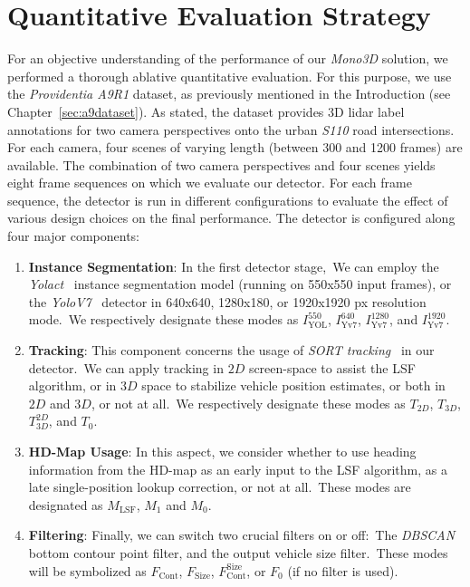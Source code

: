 
\section{Quantitative Evaluation Strategy}
\label{sec:quant}

For an objective understanding of the performance of our \textit{Mono3D} solution, we performed a thorough ablative quantitative evaluation.
For this purpose, we use the \textit{Providentia A9R1} dataset, as previously mentioned in the Introduction (see Chapter~\ref{sec:a9dataset}).
As stated, the dataset provides 3D lidar label annotations for two camera perspectives onto the urban \textit{S110} road intersections.
For each camera, four scenes of varying length (between 300 and 1200 frames) are available.
The combination of two camera perspectives and four scenes yields eight frame sequences on which we evaluate our detector.
For each frame sequence, the detector is run in different configurations to evaluate the effect of various design choices on the final performance.
The detector is configured along four major components:

\begin{enumerate}
    \item \textbf{Instance Segmentation}: In the first detector stage,\ We can employ the \textit{Yolact}~\cite{liu2021yolactedge} instance segmentation model (running on 550x550 input frames), or the \textit{YoloV7}~\cite{wang2022yolov7} detector in 640x640, 1280x180, or 1920x1920 px resolution mode.\ We respectively designate these modes as $I^{550}_\text{YOL}$, $I^{640}_\text{Yv7}$, $I^{1280}_\text{Yv7}$, and $I^{1920}_\text{Yv7}$.
    \item \textbf{Tracking}: This component concerns the usage of \textit{SORT tracking}~\cite{bewley2016simple} in our detector.\ We can apply tracking in $2D$ screen-space to assist the LSF algorithm, or in $3D$ space to stabilize vehicle position estimates, or both in $2D$ and $3D$, or not at all.\ We respectively designate these modes as $T_{2D}$, $T_{3D}$, $T^{2D}_{3D}$, and $T_0$.
    \item \textbf{HD-Map Usage}: In this aspect, we consider whether to use heading information from the HD-map as an early input to the LSF algorithm, as a late single-position lookup correction, or not at all.\ These modes are designated as $M_\text{LSF}$, $M_1$ and $M_0$.
    \item \textbf{Filtering}: Finally, we can switch two crucial filters on or off:\ The \textit{DBSCAN}~\cite{schubert2017dbscan} bottom contour point filter, and the output vehicle size filter.\ These modes will be symbolized as $F_\text{Cont}$, $F_\text{Size}$, $F_\text{Cont}^\text{Size}$, or $F_0$ (if no filter is used).
\end{enumerate}

